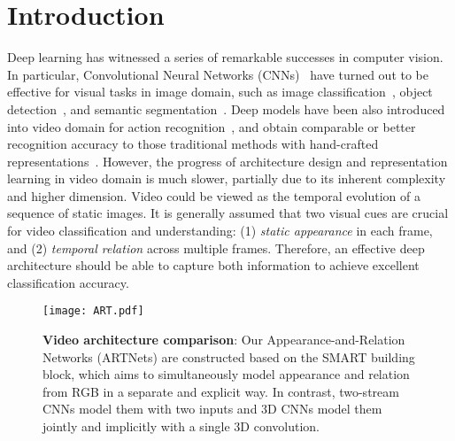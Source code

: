 \documentclass[10pt,twocolumn,letterpaper]{article}
\begin{document}
\section{Introduction}
Deep learning has witnessed a series of remarkable successes in computer vision. In particular, Convolutional Neural Networks (CNNs)~\cite{lecun-98} have turned out to be effective for visual tasks in image domain, such as image classification~\cite{KrizhevskySH12,HeZRS16,SimonyanZ14a,SzegedyLJSRAEVR15}, object detection~\cite{GirshickDDM14}, and semantic segmentation~\cite{LongSD15}. Deep models have been also introduced into video domain for action recognition~\cite{CarreiraZ17,Wang0T15,WangFG16,SimonyanZ14,WangXWQLTV16,TranBFTP15,KarpathyTSLSF14,ZhangWW0W16}, and obtain comparable or better recognition accuracy to those traditional methods with hand-crafted representations~\cite{Laptev05,WangS13a,Wang0T16}. However, the progress of architecture design and representation learning in video domain is much slower, partially due to its inherent complexity and higher dimension. Video could be viewed as the temporal evolution of a sequence of static images. It is generally assumed that two visual cues are crucial for video classification and understanding: (1) {\em static appearance} in each frame, and (2) {\em temporal relation} across multiple frames. Therefore, an effective deep architecture should be able to capture both information to achieve excellent classification accuracy.

\begin{figure*}
\texttt{[image: ART.pdf]}
\caption{{\bf Video architecture comparison}: Our Appearance-and-Relation Networks (ARTNets) are constructed based on the SMART building block, which aims to simultaneously model appearance and relation from RGB in a separate and explicit way. In contrast, two-stream CNNs model them with two inputs and 3D CNNs model them jointly and implicitly with a single 3D convolution.}
\label{fig:net}
\vspace{-4mm}
\end{figure*}
\end{document}
